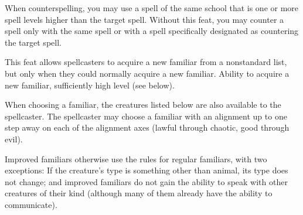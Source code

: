 {}{}
{When counterspelling, you may use a spell of the same school that is one or more spell levels higher than the target spell.}
{Without this feat, you may counter a spell only with the same spell or with a spell specifically designated as countering the target spell.}{}

{This feat allows spellcasters to acquire a new familiar from a nonstandard list, but only when they could normally acquire a new familiar.}
{Ability to acquire a new familiar, sufficiently high level (see below).}
{When choosing a familiar, the creatures listed below are also available to the spellcaster. The spellcaster may choose a familiar with an alignment up to one step away on each of the alignment axes (lawful through chaotic, good through evil).




Improved familiars otherwise use the rules for regular familiars, with two exceptions: If the creature's type is something other than animal, its type does not change; and improved familiars do not gain the ability to speak with other creatures of their kind (although many of them already have the ability to communicate).}{}{}

